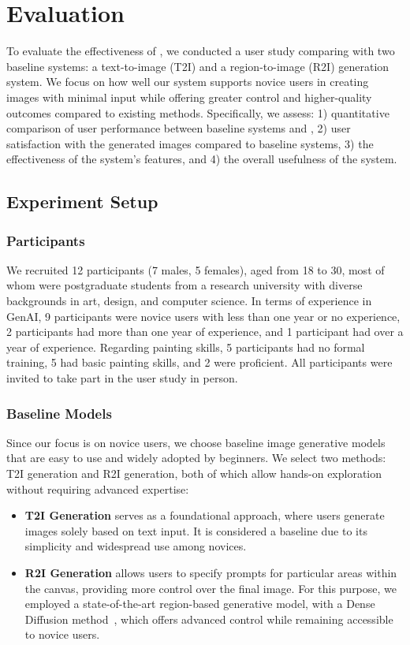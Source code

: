 \section{Evaluation}\label{sec:evaluation}
To evaluate the effectiveness of \tool, we conducted a user study comparing \tool with two baseline systems: a text-to-image (T2I) and a region-to-image (R2I) generation system. 
We focus on how well our system supports novice users in creating images with minimal input while offering greater control and higher-quality outcomes compared to existing methods. 
Specifically, we assess: 1) quantitative comparison of user performance between baseline systems and \tool,  2) user satisfaction with the generated images compared to baseline systems, 3) the effectiveness of the system’s features, and 4) the overall usefulness of the system.

\subsection{Experiment Setup}

\subsubsection{Participants}
We recruited 12 participants (7 males, 5 females), aged from 18 to 30, most of whom were postgraduate students from a research university with diverse backgrounds in art, design, and computer science. 
In terms of experience in GenAI, 9 participants were novice users with less than one year or no experience, 2 participants had more than one year of experience, and 1 participant had over a year of experience. 
Regarding painting skills, 5 participants had no formal training, 5 had basic painting skills, and 2 were proficient. All participants were invited to take part in the user study in person.

\subsubsection{Baseline Models}
Since our focus is on novice users, we choose baseline image generative models that are easy to use and widely adopted by beginners. 
We select two methods: T2I generation and R2I generation, both of which allow hands-on exploration without requiring advanced expertise:
\begin{itemize}
    \item \textbf{T2I Generation} serves as a foundational approach, where users generate images solely based on text input. It is considered a baseline due to its simplicity and widespread use among novices. 
    \item \textbf{R2I Generation} allows users to specify prompts for particular areas within the canvas, providing more control over the final image. 
    For this purpose, we employed a state-of-the-art region-based generative model, with a Dense Diffusion method~\cite{kim2023dense,omost}, which offers advanced control while remaining accessible to novice users.
\end{itemize}

